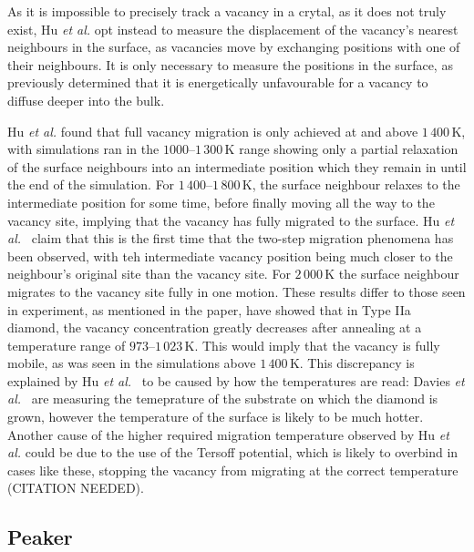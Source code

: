 \documentclass[10pt,a4paper,twocolumn,twoside]{extarticle}
\newcommand{\al}{\emph{et al. }}
\begin{document}
As it is impossible to precisely track a vacancy in a crytal, as it does not truly exist, Hu \al opt instead to measure the displacement of the vacancy's nearest neighbours in the surface, as vacancies move by exchanging positions with one of their neighbours. It is only necessary to measure the positions in the surface, as \textcite{Halicioglu} previously determined that it is energetically unfavourable for a vacancy to diffuse deeper into the bulk. 

Hu \al found that full vacancy migration is only achieved at and above $1\,400$\,K, with simulations ran in the $1000$--$1\,300$\,K range showing only a partial relaxation of the surface neighbours into an intermediate position which they remain in until the end of the simulation. For $1\,400$--$1\,800$\,K, the surface neighbour relaxes to the intermediate position for some time, before finally moving all the way to the vacancy site, implying that the vacancy has fully migrated to the surface. Hu \al~claim that this is the first time that the two-step migration phenomena has been observed, with teh intermediate vacancy position being much closer to the neighbour's original site than the vacancy site. For $2\,000$\,K the surface neighbour migrates to the vacancy site fully in one motion. These results differ to those seen in experiment, as mentioned in the paper, \textcite{Davies} have showed that in Type IIa diamond, the vacancy concentration greatly decreases after annealing at a temperature range of $973$--$1\,023$\,K. This would imply that the vacancy is fully mobile, as was seen in the simulations above $1\,400$\,K. This discrepancy is explained by Hu \al~to be caused by how the temperatures are read: Davies \al~are measuring the temeprature of the substrate on which the diamond is grown, however the temperature of the surface is likely to be much hotter. Another cause of the higher required migration temperature observed by Hu \al could be due to the use of the Tersoff potential, which is likely to overbind in cases like these, stopping the vacancy from migrating at the correct temperature (CITATION NEEDED).

\subsection{Peaker}


\printbibliography
\end{document}
